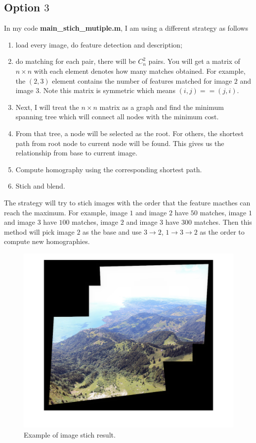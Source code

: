 \documentclass[a4paper]{article}
\begin{document}
\subsection{Option $3$}
In my code \textbf{main\_stich\_mutiple.m}, I am using a different strategy as follows
\begin{enumerate}
	\item load every image, do feature detection and description;
	\item do matching for each pair, there will be $C_n^2$ pairs. You will get a matrix of $n \times n$ with each element denotes how many matches obtained. For example, the $(2,3)$ element contains the number of features matched for image $2$ and image $3$. Note this matrix is symmetric which means $(i,j)==(j,i)$. 
	\item Next, I will treat the  $n \times n$ matrix as a graph and find the minimum spanning tree which will connect all nodes with the minimum cost. 
	\item From that tree, a node will be selected as the root. For others, the shortest path from root node to current node will be found. This gives us the relationship from base to current image.
	\item Compute homography using the corresponding shortest path.
	\item Stich and blend.
\end{enumerate}
The strategy will try to stich images with the order that the feature macthes can reach the maximum. For example, image $1$ and image $2$ have $50$ matches,  image $1$ and image $3$ have $100$ matches,  image $2$ and image $3$ have $300$ matches. Then this method will pick image $2$ as the base and use $3 \to 2$, $1\to3\to2$ as the order to compute new homographies.

\begin{figure}[!b]
	\centering
	\includegraphics[scale=0.3]{figures/stich_multiple.png}
	\caption{Example of image stich result.}
\end{figure}
\end{document}
